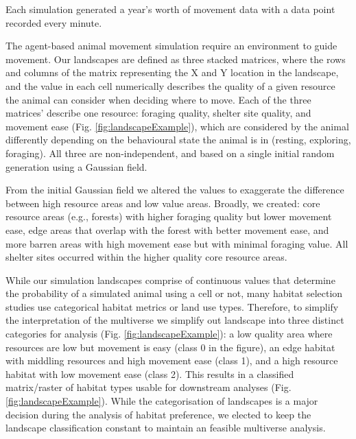 \documentclass[10pt,a4paper]{article}
\begin{document}
Each simulation generated a year's worth of movement data with a data point recorded every minute.

The agent-based animal movement simulation require an environment to guide movement.
Our landscapes are defined as three stacked matrices, where the rows and columns of the matrix representing the X and Y location in the landscape, and the value in each cell numerically describes the quality of a given resource the animal can consider when deciding where to move.
Each of the three matrices' describe one resource: foraging quality, shelter site quality, and movement ease (Fig. \ref{fig:landscapeExample}), which are considered by the animal differently depending on the behavioural state the animal is in (resting, exploring, foraging).
All three are non-independent, and based on a single initial random generation using a Gaussian field.

From the initial Gaussian field we altered the values to exaggerate the difference between high resource areas and low value areas.
Broadly, we created: core resource areas (e.g., forests) with higher foraging quality but lower movement ease, edge areas that overlap with the forest with better movement ease, and more barren areas with high movement ease but with minimal foraging value.
All shelter sites occurred within the higher quality core resource areas.

While our simulation landscapes comprise of continuous values that determine the probability of a simulated animal using a cell or not, many habitat selection studies use categorical habitat metrics or land use types.
Therefore, to simplify the interpretation of the multiverse we simplify out landscape into three distinct categories for analysis (Fig. \ref{fig:landscapeExample}): a low quality area where resources are low but movement is easy (class 0 in the figure), an edge habitat with middling resources and high movement ease (class 1), and a high resource habitat with low movement ease (class 2).
This results in a classified matrix/raster of habitat types usable for downstream analyses (Fig. \ref{fig:landscapeExample}).
While the categorisation of landscapes is a major decision during the analysis of habitat preference, we elected to keep the landscape classification constant to maintain an feasible multiverse analysis.
\end{document}
